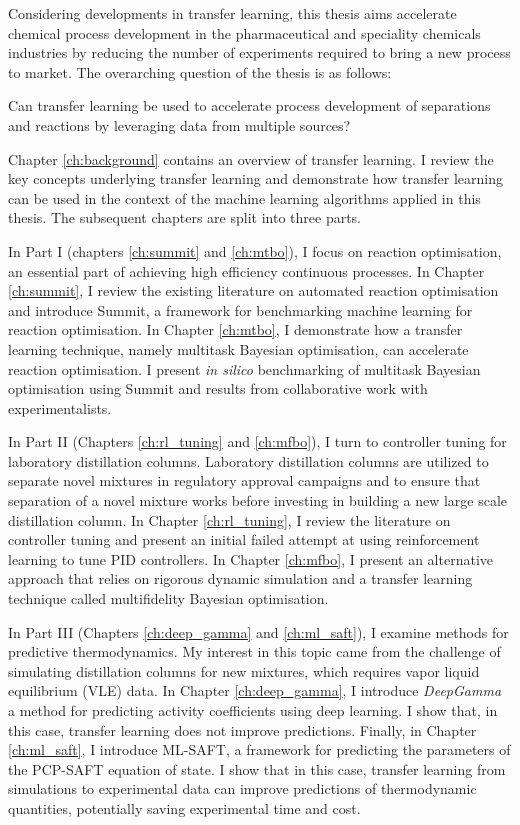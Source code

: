 Considering developments in transfer learning, this thesis aims accelerate chemical process development in the pharmaceutical and speciality chemicals industries by reducing the number of experiments required to bring a new process to market. The overarching question of the thesis is as follows:
\begin{displayquote}
Can transfer learning be used to accelerate process development of separations and reactions by leveraging data from multiple sources? 
\end{displayquote}
Chapter \ref{ch:background} contains an overview of transfer learning. I review the key concepts underlying transfer learning and demonstrate how transfer learning can be used in the context of the machine learning algorithms applied in this thesis.  The subsequent chapters are split into three parts.

In Part I (chapters \ref{ch:summit} and \ref{ch:mtbo}), I focus on reaction optimisation, an essential part of achieving high efficiency continuous processes. In Chapter \ref{ch:summit}, I review the existing literature on automated reaction optimisation and introduce Summit, a framework for benchmarking machine learning for reaction optimisation.  In Chapter \ref{ch:mtbo}, I demonstrate how a transfer learning technique, namely multitask Bayesian optimisation, can accelerate reaction optimisation. I present \textit{in silico} benchmarking of multitask Bayesian optimisation using Summit and results from collaborative work with experimentalists.

In Part II (Chapters \ref{ch:rl_tuning} and \ref{ch:mfbo}), I turn to controller tuning for laboratory distillation columns. Laboratory distillation columns are utilized to separate novel mixtures in regulatory approval campaigns and to ensure that separation of a novel mixture works before investing in building a new large scale distillation column. In Chapter \ref{ch:rl_tuning}, I review the literature on controller tuning and present an initial failed attempt at using reinforcement learning to tune PID controllers. In Chapter \ref{ch:mfbo}, I present an alternative approach that relies on rigorous dynamic simulation and a transfer learning technique called multifidelity Bayesian optimisation.

In Part III (Chapters \ref{ch:deep_gamma} and \ref{ch:ml_saft}), I examine methods for predictive thermodynamics. My interest in this topic came from the challenge of simulating distillation columns for new mixtures, which requires vapor liquid equilibrium (VLE) data. In Chapter \ref{ch:deep_gamma}, I introduce \textit{DeepGamma} a method for predicting activity coefficients using deep learning. I show that, in this case, transfer learning does not improve predictions. Finally, in Chapter \ref{ch:ml_saft}, I introduce ML-SAFT, a framework for predicting the parameters of the PCP-SAFT equation of state. I show that in this case, transfer learning from simulations to experimental data can improve predictions of thermodynamic quantities, potentially saving experimental time and cost.





